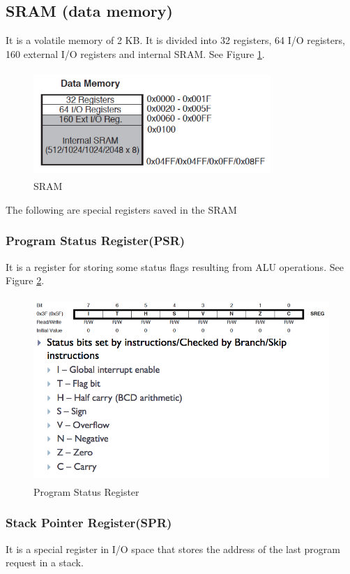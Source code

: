 \subsection{SRAM (data memory)}
It is a volatile memory of 2 KB. It is divided into 32 registers, 64 I/O registers, 160 external I/O registers and internal SRAM. See Figure \ref{SRAMcontents}.

\begin{figure}[h!]
\centering
\includegraphics[height=4cm, width=9cm]{registers.png}
\caption{SRAM \protect\cite{WashUni:URL}}
\label{SRAMcontents}
\end{figure}

\newpage

\noindent The following are special registers saved in the SRAM 

\subsubsection{Program Status Register(PSR)}
It is a register for storing some status flags resulting from ALU operations. See Figure \ref{ProgramStatusRegister}.

\begin{figure}[h!]
\centering
\includegraphics[height=7cm, width=12cm]{PSR.png}
\caption{Program Status Register \protect\cite{WashUni:URL}}
\label{ProgramStatusRegister}
\end{figure}

\subsubsection{Stack Pointer Register(SPR)}
It is a special register in I/O space that stores the address of the last program request in a stack.

